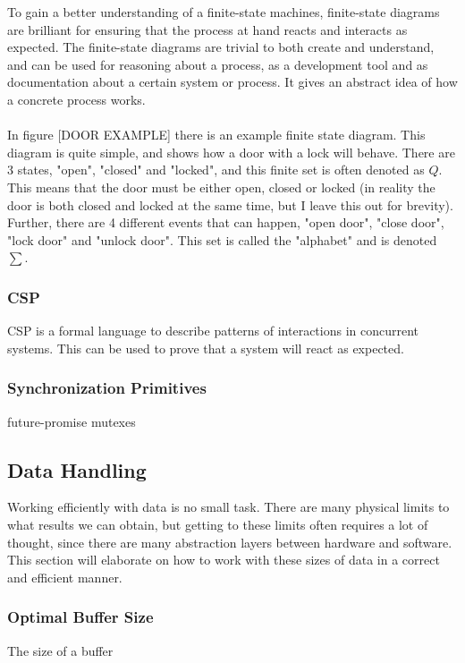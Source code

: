 \documentclass[a4paper]{article}
\begin{document}
To gain a better understanding of a finite-state machines, finite-state diagrams are brilliant for ensuring that the process at hand reacts and
interacts as expected. The finite-state diagrams are trivial to both create and understand, and can be used for reasoning about a process,
as a development tool and as documentation about a certain system or process. It gives an abstract idea of how a concrete process works.\\\\

In figure [DOOR EXAMPLE] there is an example finite state diagram. This diagram is quite simple, and shows how a door with a lock will behave.
There are 3 states, "open", "closed" and "locked", and this finite set is often denoted as $Q$. This means that the door must be either open, closed or locked (in reality the door is both closed and locked at the same time, but I leave this out for brevity). Further, there are 4 different events
that can happen, "open door", "close door", "lock door" and "unlock door". This set is called the "alphabet" and is denoted $\sum$.





\subsubsection{CSP}
CSP is a formal language to describe patterns of interactions in concurrent systems. This can be used to prove that a system
will react as expected.


\subsubsection{Synchronization Primitives}
future-promise
mutexes


\subsection{Data Handling}
Working efficiently with data is no small task. There are many physical limits to what results we can obtain, but getting
to these limits often requires a lot of thought, since there are many abstraction layers between hardware and software. This section
will elaborate on how to work with these sizes of data in a correct and efficient manner.


\subsubsection{Optimal Buffer Size}
The size of a buffer
\end{document}
